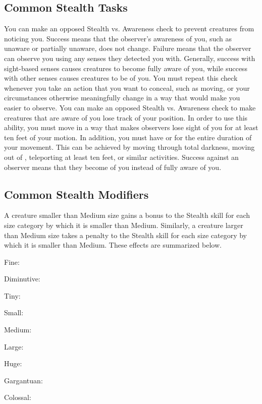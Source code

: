   \subsection{Common Stealth Tasks}
     You can make an opposed Stealth vs. Awareness check to prevent creatures from noticing you.
    Success means that the observer's awareness of you, such as unaware or partially unaware, does not change.
    Failure means that the observer can observe you using any senses they detected you with.
    Generally, success with sight-based senses causes creatures to become fully aware of you, while success with other senses causes creatures to be \partiallyunaware of you.
    You must repeat this check whenever you take an action that you want to conceal, such as moving, or your circumstances otherwise meaningfully change in a way that would make you easier to observe.
     You can make an opposed Stealth vs. Awareness check to make creatures that are aware of you lose track of your position.
    In order to use this ability, you must move in a way that makes observers lose sight of you for at least ten feet of your motion.
    In addition, you must have  or  for the entire duration of your movement.
    This can be achieved by moving through total darkness, moving out of , teleporting at least ten feet, or similar activities.
    Success against an observer means that they become \partiallyunaware of you instead of fully aware of you.

  \subsection{Common Stealth Modifiers}\label{Common Stealth Modifiers}

    A creature smaller than Medium size gains a  bonus to the Stealth skill for each size category by which it is smaller than Medium.
    Similarly, a creature larger than Medium size takes a  penalty to the Stealth skill for each size category by which it is smaller than Medium.
    These effects are summarized below.
    \begin{raggeditemize}
      \item Fine: 
      \item Diminutive: 
      \item Tiny: 
      \item Small: 
      \item Medium: 
      \item Large: 
      \item Huge: 
      \item Gargantuan: 
      \item Colossal: 
    \end{raggeditemize}

